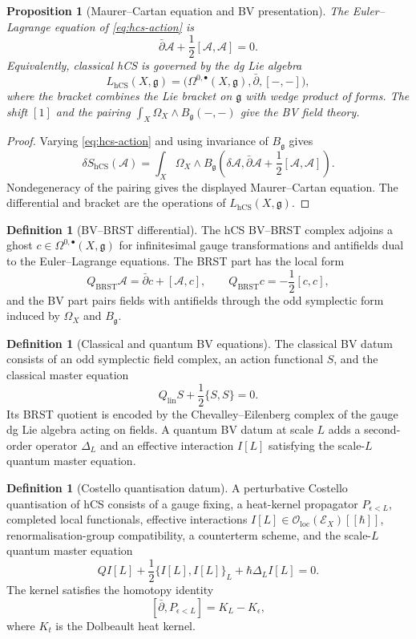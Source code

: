 \documentclass[11pt]{amsart}
\newtheorem{proposition}[theorem]{Proposition}
\theoremstyle{definition}
\newtheorem{definition}[theorem]{Definition}
\theoremstyle{remark}
\providecommand{\cO}{\mathcal{O}}
\providecommand{\hCS}{\mathrm{hCS}}
\providecommand{\gfrak}{\mathfrak{g}}
\begin{document}
\begin{proposition}[Maurer--Cartan equation and BV presentation]
\label{prop:hcs-mc}
The Euler--Lagrange equation of \eqref{eq:hcs-action} is
\[
\bar\partial\mathcal A+\frac12[\mathcal A,\mathcal A]=0.
\]
Equivalently, classical hCS is governed by the dg Lie algebra
\[
L_{\hCS}(X,\gfrak)=
\bigl(\Omega^{0,\bullet}(X,\gfrak),\bar\partial,[-,-]\bigr),
\]
where the bracket combines the Lie bracket on $\gfrak$ with wedge product
of forms. The shift $[1]$ and the pairing
$\int_X\Omega_X\wedge B_\gfrak(-,-)$ give the BV field theory.
\end{proposition}

\begin{proof}
Varying \eqref{eq:hcs-action} and using invariance of $B_\gfrak$ gives
\[
\delta S_{\hCS}(\mathcal A)=
\int_X\Omega_X\wedge
B_\gfrak\!\left(
\delta\mathcal A,
\bar\partial\mathcal A+\frac12[\mathcal A,\mathcal A]
\right).
\]
Nondegeneracy of the pairing gives the displayed Maurer--Cartan
equation. The differential and bracket are the operations of
$L_{\hCS}(X,\gfrak)$.
\end{proof}

\begin{definition}[BV--BRST differential]
\label{def:bv-brst}
The hCS BV--BRST complex adjoins a ghost $c\in
\Omega^{0,\bullet}(X,\gfrak)$ for infinitesimal gauge transformations
and antifields dual to the Euler--Lagrange equations. The BRST part has
the local form
\[
Q_{\mathrm{BRST}}\mathcal A
=
\bar\partial c+[\mathcal A,c],
\qquad
Q_{\mathrm{BRST}}c=-\frac12[c,c],
\]
and the BV part pairs fields with antifields through the odd symplectic
form induced by $\Omega_X$ and $B_\gfrak$.
\end{definition}

\begin{definition}[Classical and quantum BV equations]
\label{def:cme-qme}
The classical BV datum consists of an odd symplectic field complex, an
action functional $S$, and the classical master equation
\[
Q_{\mathrm{lin}}S+\frac12\{S,S\}=0.
\]
Its BRST quotient is encoded by the Chevalley--Eilenberg complex of the
gauge dg Lie algebra acting on fields. A quantum BV datum at scale $L$
adds a second-order operator $\Delta_L$ and an effective interaction
$I[L]$ satisfying the scale-$L$ quantum master equation.
\end{definition}

\begin{definition}[Costello quantisation datum]
\label{def:costello-quantization}
A perturbative Costello quantisation of hCS consists of a gauge fixing,
a heat-kernel propagator $P_{\epsilon<L}$, completed local functionals,
effective interactions $I[L]\in\cO_{\mathrm{loc}}(\mathcal E_X)[[\hbar]]$,
renormalisation-group compatibility, a counterterm scheme, and the
scale-$L$ quantum master equation
\[
QI[L]+\frac12\{I[L],I[L]\}_L+\hbar\Delta_LI[L]=0.
\]
The kernel satisfies the homotopy identity
\[
[\bar\partial,P_{\epsilon<L}]=K_L-K_\epsilon,
\]
where $K_t$ is the Dolbeault heat kernel.
\end{definition}
\end{document}
